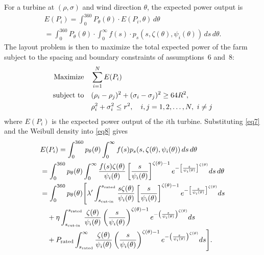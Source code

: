 \documentclass[journal,twoside]{IEEEtran}
\begin{document}
For a turbine at \( (\rho, \sigma) \) and wind direction \( \theta \), the expected power output is
\begin{multline}\label{eq8}
E(P_i) = \int_0^{360} P_\theta(\theta) \cdot E(P_i,\theta) \, d\theta \\= \int_0^{360} P_\theta(\theta) \cdot \int_0^{\infty} f(s) \cdot
       p_s(s, \zeta(\theta), \psi_i(\theta)) \, ds \, d\theta .
\end{multline}
The layout problem is then to maximize the total expected power of the farm subject to the spacing and boundary constraints of assumptions~6 and~8:
\begin{align*}
\text{Maximize} \quad & \sum_{i=1}^{N} E(P_i) \notag \\
\text{subject to} \quad & (\rho_i - \rho_j)^2 + (\sigma_i - \sigma_j)^2 \geq 64R^2, \notag \\
& \rho_i^2 + \sigma_i^2 \leq r^2, \quad i,j=1,2,\dots,N,\ i \neq j
\end{align*}
where $E(P_i)$ is the expected power output of the $i$th turbine. Substituting \eqref{eq7} and the Weibull density into \eqref{eq8} gives
{\small
\begin{align*}
&E(P_i) = \int_0^{360} p_\theta(\theta) \int_0^{\infty} f(s) p_s(s, \zeta(\theta), \psi_i(\theta)) \, ds \, d\theta \notag \\
&= \int_0^{360} p_\theta(\theta) \int_0^{\infty}  \frac{f(s)\zeta(\theta)}{\psi_i(\theta)} \left[\frac{s}{\psi_i(\theta)}\right]^{\zeta(\theta)-1} e^{-\left[\frac{s}{\psi_i(\theta)}\right]^{\zeta(\theta)}} ds \, d\theta \notag \\
&= \int_0^{360} p_\theta(\theta) \Bigg[ \lambda' \int_{s_{\text{cut-in}}}^{s_{\text{rated}}}   \frac{s\zeta(\theta)}{\psi_i(\theta)}\left[\frac{s}{\psi_i(\theta)}\right]^{\zeta(\theta)-1} e^{-\left[\frac{s}{\psi_i(\theta)}\right]^{\zeta(\theta)}} ds \notag \\
&\quad + \eta \int_{s_{\text{cut-in}}}^{s_{\text{rated}}} \frac{\zeta(\theta)}{\psi_i(\theta)} \left(\frac{s}{\psi_i(\theta)}\right)^{\zeta(\theta)-1} e^{-\left(\frac{s}{\psi_i(\theta)}\right)^{\zeta(\theta)}} ds \notag \\
&\quad + P_{\text{rated}} \int_{s_{\text{rated}}}^{\infty} \frac{\zeta(\theta)}{\psi_i(\theta)} \left(\frac{s}{\psi_i(\theta)}\right)^{\zeta(\theta)-1} e^{-\left(\frac{s}{\psi_i(\theta)}\right)^{\zeta(\theta)}} ds \Bigg].
\end{align*}
}
\end{document}
